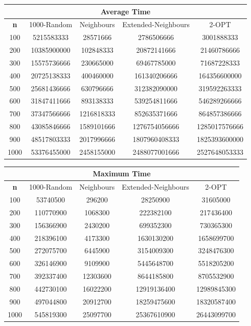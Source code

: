 \documentclass{article}
\begin{document}
\begin{center}
\begin{tabular}{|c|c|c|c|c|}
\hline
\multicolumn{5}{|c|}{\textbf{Average Time}}\\
\hline
\textbf{n} & 1000-Random & Neighbours & Extended-Neighbours & 2-OPT\\
\hline
100 & 5215583333 & 28571666 & 2786506666 & 3001888333\\
\hline
200 & 10385900000 & 102848333 & 20872141666 & 21460786666\\
\hline
300 & 15575736666 & 230665000 & 69467785000 & 71687228333\\
\hline
400 & 20725138333 & 400460000 & 161340206666 & 164356600000\\
\hline
500 & 25681436666 & 630796666 & 312382090000 & 319592263333\\
\hline
600 & 31847411666 & 893138333 & 539254811666 & 546289266666\\
\hline
700 & 37347566666 & 1216818333 & 852635371666 & 864857386666\\
\hline
800 & 43085846666 & 1589101666 & 1276754056666 & 1285017576666\\
\hline
900 & 48517803333 & 2017996666 & 1807960408333 & 1825393600000\\
\hline
1000 & 53376455000 & 2458155000 & 2488077001666 & 2527648053333\\
\hline
\end{tabular}
\end{center}

\begin{center}
\begin{tabular}{|c|c|c|c|c|}
\hline
\multicolumn{5}{|c|}{\textbf{Maximum Time}}\\
\hline
\textbf{n} & 1000-Random & Neighbours & Extended-Neighbours & 2-OPT\\
\hline
100 & 53740500 & 296200 & 28250900 & 31605000\\
\hline
200 & 110770900 & 1068300 & 222382100 & 217436400\\
\hline
300 & 156366900 & 2430200 & 699352300 & 730365300\\
\hline
400 & 218396100 & 4173300 & 1630130200 & 1658699700\\
\hline
500 & 272075700 & 6445900 & 3154009300 & 3248476300\\
\hline
600 & 326146900 & 9109900 & 5445648700 & 5518205200\\
\hline
700 & 392337400 & 12303600 & 8644185800 & 8705532900\\
\hline
800 & 442730100 & 16022200 & 12919136400 & 12989845300\\
\hline
900 & 497044800 & 20912700 & 18259475600 & 18320587400\\
\hline
1000 & 545819300 & 25097700 & 25367610900 & 26443099700\\
\hline
\end{tabular}
\end{center}
\end{document}
